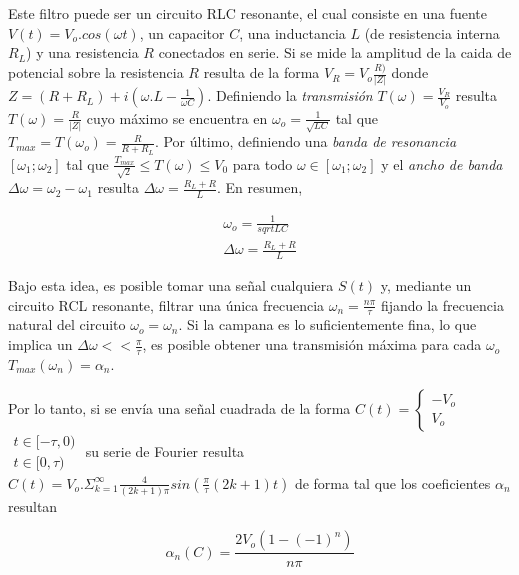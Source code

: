 \documentclass[11pt,a4paper]{article}
\begin{document}
Este filtro puede ser un circuito RLC resonante, el cual consiste en una fuente $V(t) = V_o.cos(\omega t)$, un capacitor $C$, una inductancia $L$ (de resistencia interna $R_L$) y una resistencia $R$ conectados en serie. Si se mide la amplitud de la caida de potencial sobre la resistencia $R$ resulta de la forma $V_R = V_o\frac{R)}{|Z|}$ donde $Z = (R+R_L)+i(\omega.L-\frac{1}{\omega C})$. Definiendo la \textit{transmisión} $T(\omega) = \frac{V_R}{V_o}$ resulta $T(\omega) = \frac{R}{|Z|}$ cuyo máximo se encuentra en $\omega_o = \frac{1}{\sqrt{LC}}$ tal que $T_{max} = T(\omega_o) = \frac{R}{R+R_L}$. Por último, definiendo una \textit{banda de resonancia} $[\omega_1;\omega_2]$ tal que $\frac{T_{max}}{\sqrt{2}} \leq T(\omega) \leq V_{0}$ para todo $\omega \in [\omega_1;\omega_2]$ y el \textit{ancho de banda} $\Delta\omega = \omega_2 - \omega_1$ resulta $\Delta\omega = \frac{R_L+R}{L}$. En resumen,

\begin{equation}
\begin{split}
\omega_o = \frac{1}{sqrt{LC}}\\
\Delta\omega = \frac{R_L+R}{L}
\end{split}
\label{eq:resonante}
\end{equation}

Bajo esta idea, es posible tomar una señal cualquiera $S(t)$ y, mediante un circuito RCL resonante, filtrar una única frecuencia $\omega_n = \frac{n\pi}{\tau}$ fijando la frecuencia natural del circuito $\omega_o = \omega_n$. Si la campana es lo suficientemente fina, lo que implica un $\Delta \omega << \frac{\pi}{\tau}$, es posible obtener una transmisión máxima para cada $\omega_o$ $T_{max}(\omega_n) = \alpha_n$.

Por lo tanto, si se envía una señal cuadrada de la forma $C(t)=
\left\{\begin{matrix}
-V_o \\ V_o
\end{matrix}\right.$
$\begin{matrix}
t\in[-\tau,0)\\ t\in[0,\tau)
\end{matrix}$
su serie de Fourier resulta $C(t) = V_o.\Sigma_{k=1}^{\infty} \frac{4}{(2k+1)\pi}sin(\frac{\pi}{\tau}(2k+1)t)$ de forma tal que los coeficientes $\alpha_n$ resultan

\begin{equation}
\alpha_n(C) = \frac{2V_o(1-(-1)^n)}{n\pi}
\label{eq:coef_cuad}
\end{equation}
\end{document}
